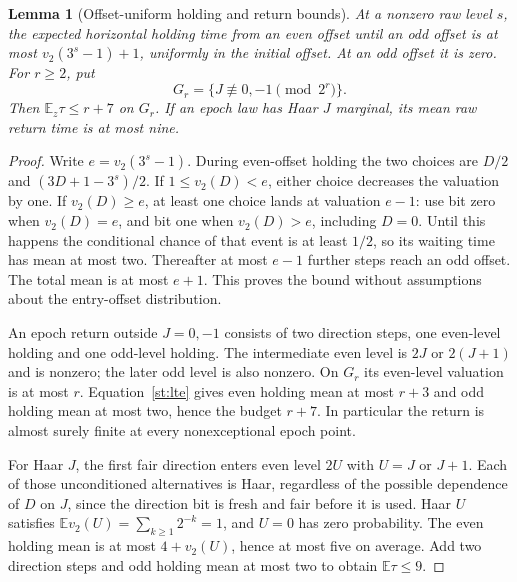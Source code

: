 \documentclass[11pt]{amsart}
\newtheorem{lemma}[theorem]{Lemma}
\theoremstyle{definition}
\theoremstyle{remark}
\newcommand{\E}{\mathbb E}
\begin{document}
\begin{lemma}[Offset-uniform holding and return bounds]\label{occ:holding}
At a nonzero raw level $s$, the expected horizontal holding time from an
even offset until an odd offset is at most $v_2(3^s-1)+1$, uniformly in
the initial offset.  At an odd offset it is zero.  For $r\ge2$, put
\[
 G_r=\{J\not\equiv0,-1\pmod{2^r}\}.
\]
Then $\E_z\tau\le r+7$ on $G_r$.  If an epoch law has Haar $J$
marginal, its mean raw return time is at most nine.
\end{lemma}
\begin{proof}
Write $e=v_2(3^s-1)$.  During even-offset holding the two choices are
$D/2$ and $(3D+1-3^s)/2$.  If $1\le v_2(D)<e$, either choice decreases
the valuation by one.  If $v_2(D)\ge e$, at least one choice lands at
valuation $e-1$: use bit zero when $v_2(D)=e$, and bit one when
$v_2(D)>e$, including $D=0$.  Until this happens the conditional chance
of that event is at least $1/2$, so its waiting time has mean at most two.
Thereafter at most $e-1$ further steps reach an odd offset.  The total
mean is at most $e+1$.  This proves the bound without assumptions about
the entry-offset distribution.

An epoch return outside $J=0,-1$ consists of two direction steps, one
even-level holding and one odd-level holding.  The intermediate even
level is $2J$ or $2(J+1)$ and is nonzero; the later odd level is also
nonzero.  On $G_r$ its even-level valuation is at most $r$.
Equation~\eqref{st:lte} gives even holding mean at most $r+3$ and odd
holding mean at most two, hence the budget $r+7$.  In particular the
return is almost surely finite at every nonexceptional epoch point.

For Haar $J$, the first fair direction enters even level $2U$ with
$U=J$ or $J+1$.  Each of those unconditioned alternatives is Haar,
regardless of the possible dependence of $D$ on $J$, since the direction
bit is fresh and fair before it is used.  Haar $U$ satisfies
$\E v_2(U)=\sum_{k\ge1}2^{-k}=1$, and $U=0$ has zero probability.
The even holding mean is at most $4+v_2(U)$, hence at most five on
average.  Add two direction steps and odd holding mean at most two to
obtain $\E\tau\le9$.
\end{proof}
\end{document}
